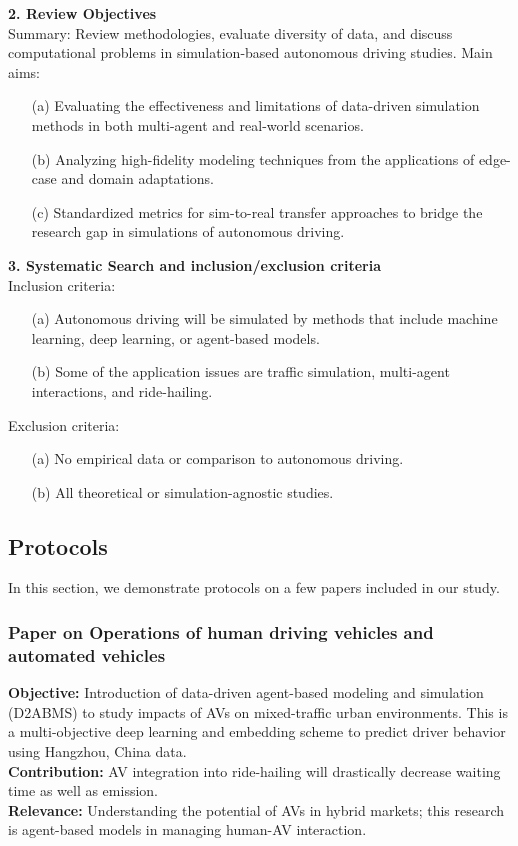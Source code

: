 \documentclass[lettersize,journal]{IEEEtran}
\begin{document}
\textbf{2. Review Objectives} \\
Summary: Review methodologies, evaluate diversity of data, and discuss computational problems in simulation-based autonomous driving studies. Main aims:
\begin{itemize}
    \item[(a)] Evaluating the effectiveness and limitations of data-driven simulation methods in both multi-agent and real-world scenarios.
    \item[(b)] Analyzing high-fidelity modeling techniques from the applications of edge-case and domain adaptations.
    \item[(c)] Standardized metrics for sim-to-real transfer approaches to bridge the research gap in simulations of autonomous driving.
\end{itemize}

\textbf{3. Systematic Search and inclusion/exclusion criteria} \\
Inclusion criteria:
\begin{itemize}
    \item[(a)] Autonomous driving will be simulated by methods that include machine learning, deep learning, or agent-based models.
    \item[(b)] Some of the application issues are traffic simulation, multi-agent interactions, and ride-hailing.
\end{itemize}

Exclusion criteria:
\begin{itemize}
    \item[(a)] No empirical data or comparison to autonomous driving.
    \item[(b)] All theoretical or simulation-agnostic studies.
\end{itemize}


\subsection{Protocols}
In this section, we demonstrate protocols on a few papers included in our study.

\subsubsection{Paper on Operations of human driving vehicles and automated vehicles}\cite{ref41}
\textbf{Objective:} Introduction of data-driven agent-based modeling and simulation (D2ABMS) to study impacts of AVs on mixed-traffic urban environments. This is a multi-objective deep learning and embedding scheme to predict driver behavior using Hangzhou, China data. \\
\textbf{Contribution:} AV integration into ride-hailing will drastically decrease waiting time as well as emission. \\
\textbf{Relevance:} Understanding the potential of AVs in hybrid markets; this research is agent-based models in managing human-AV interaction.
\end{document}
